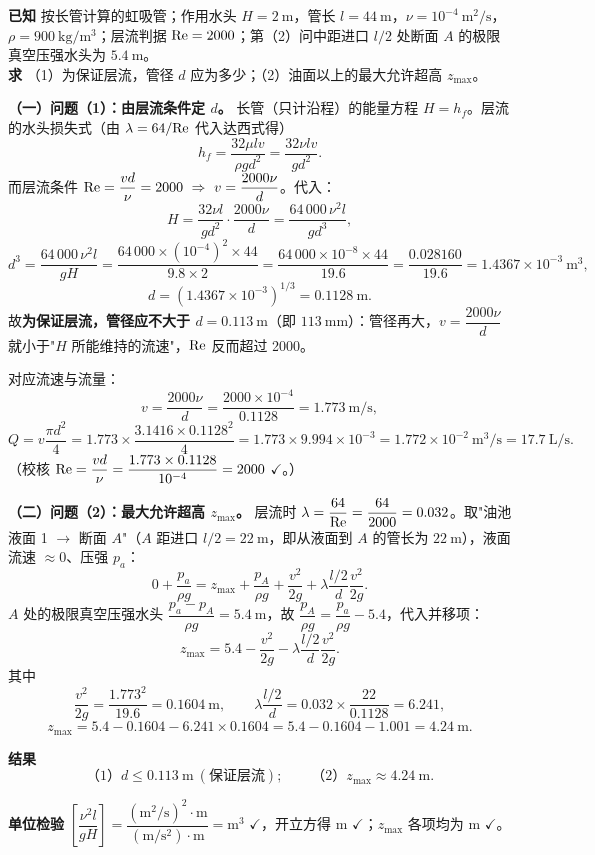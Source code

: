 \begin{jie}
\textbf{已知} 按长管计算的虹吸管；作用水头 $H=2\ \mathrm{m}$，管长 $l=44\ \mathrm{m}$，$\nu=10^{-4}\ \mathrm{m^2/s}$，$\rho=900\ \mathrm{kg/m^3}$；层流判据 $\mathrm{Re}=2000$；第（2）问中距进口 $l/2$ 处断面 $A$ 的极限真空压强水头为 $5.4\ \mathrm{m}$。\\
\textbf{求} （1）为保证层流，管径 $d$ 应为多少；（2）油面以上的最大允许超高 $z_{\max}$。

\textbf{（一）问题（1）：由层流条件定 $d$。} 长管（只计沿程）的能量方程 $H=h_f$。层流的水头损失式（由 $\lambda=64/\mathrm{Re}$ 代入达西式得）
\[h_f=\frac{32\mu lv}{\rho gd^2}=\frac{32\nu lv}{gd^2}.\]
而层流条件 $\Rey=\dfrac{vd}{\nu}=2000\ \Rightarrow\ v=\dfrac{2000\nu}{d}$。代入：
\[H=\frac{32\nu l}{gd^2}\cdot\frac{2000\nu}{d}=\frac{64\,000\,\nu^2l}{gd^3},\]
\[d^3=\frac{64\,000\,\nu^2l}{gH}
=\frac{64\,000\times(10^{-4})^2\times44}{9.8\times2}
=\frac{64\,000\times10^{-8}\times44}{19.6}
=\frac{0.028160}{19.6}=1.4367\times10^{-3}\ \mathrm{m^3},\]
\[d=\left(1.4367\times10^{-3}\right)^{1/3}=0.1128\ \mathrm{m}.\]
故\textbf{为保证层流，管径应不大于 $d=0.113\ \mathrm{m}$}（即 $113\ \mathrm{mm}$）：管径再大，$v=\dfrac{2000\nu}{d}$ 就小于"$H$ 所能维持的流速"，$\mathrm{Re}$ 反而超过 2000。

对应流速与流量：
\[v=\frac{2000\nu}{d}=\frac{2000\times10^{-4}}{0.1128}=1.773\ \mathrm{m/s},\]
\[Q=v\frac{\pi d^2}{4}=1.773\times\frac{3.1416\times0.1128^2}{4}=1.773\times9.994\times10^{-3}=1.772\times10^{-2}\ \mathrm{m^3/s}=17.7\ \mathrm{L/s}.\]
（校核 $\mathrm{Re}=\dfrac{vd}{\nu}=\dfrac{1.773\times0.1128}{10^{-4}}=2000$ $\checkmark$。）

\textbf{（二）问题（2）：最大允许超高 $z_{\max}$。} 层流时 $\lambda=\dfrac{64}{\mathrm{Re}}=\dfrac{64}{2000}=0.032$。取"油池液面 1 $\to$ 断面 $A$"（$A$ 距进口 $l/2=22\ \mathrm{m}$，即从液面到 $A$ 的管长为 $22\ \mathrm{m}$），液面流速 $\approx0$、压强 $p_a$：
\[0+\frac{p_a}{\rho g}=z_{\max}+\frac{p_A}{\rho g}+\frac{v^2}{2g}+\lambda\frac{l/2}{d}\frac{v^2}{2g}.\]
$A$ 处的极限真空压强水头 $\dfrac{p_a-p_A}{\rho g}=5.4\ \mathrm{m}$，故 $\dfrac{p_A}{\rho g}=\dfrac{p_a}{\rho g}-5.4$，代入并移项：
\[z_{\max}=5.4-\frac{v^2}{2g}-\lambda\frac{l/2}{d}\frac{v^2}{2g}.\]
其中
\[\frac{v^2}{2g}=\frac{1.773^2}{19.6}=0.1604\ \mathrm{m},\qquad
\lambda\frac{l/2}{d}=0.032\times\frac{22}{0.1128}=6.241,\]
\[z_{\max}=5.4-0.1604-6.241\times0.1604=5.4-0.1604-1.001=4.24\ \mathrm{m}.\]

\textbf{结果}
\[\boxed{\text{（1）}d\le0.113\ \mathrm{m}\ (\text{保证层流});\qquad
\text{（2）}z_{\max}\approx4.24\ \mathrm{m}}.\]

\textbf{单位检验} $\left[\dfrac{\nu^2l}{gH}\right]=\dfrac{(\mathrm{m^2/s})^2\cdot\mathrm{m}}{(\mathrm{m/s^2})\cdot\mathrm{m}}=\mathrm{m^3}$ $\checkmark$，开立方得 $\mathrm{m}$ $\checkmark$；$z_{\max}$ 各项均为 $\mathrm{m}$ $\checkmark$。
\end{jie}

